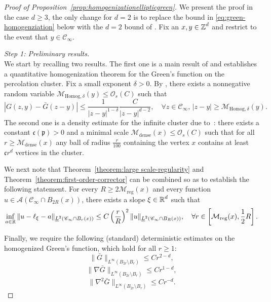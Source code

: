 \documentclass[12pt]{amsart}
\numberwithin{equation}{section}
\begin{document}
	\begin{proof}[Proof of Proposition~\ref{prop:homogenizationellipticgreen}]
		We present the proof in the case $d \geq 3$, the only change for $d = 2$ is to replace the bound in \eqref{eq:green-homogenziation} below
		with the $d=2$ bound of \cite{dario-gu-green}. Fix an $x, y \in \operatorname{\mathbb{Z}}^d$ and restrict to the event that $y \in \mathscr{C}_{\infty}$. 
		
		{\it Step 1: Preliminary results.} \\ 
		We start by recalling two results. The first one is a main result of \cite{dario-gu-green} and establishes a quantitative homogenization theorem for the Green's function on the percolation cluster. 
		Fix a small exponent $\delta > 0$. 
		By \cite[Theorem 2]{dario-gu-green}, there exists a nonnegative random variable $\mathcal{M}_{\mathrm{Homog}, \delta}(y) \leq \mathcal{O}_s(C)$ such that 
		\begin{equation} \label{eq:green-homogenziation}
			|G(z,y) - \bar{G}(z-y)|  \leq \frac{1}{|z-y|^{1-\delta}}  \frac{C}{|z-y|^{d-2}}, \quad \forall z \in \mathscr{C}_\infty, \, |z-y| \geq \mathcal{M}_{\mathrm{Homog}, \delta}(y).
		\end{equation}
		The second one is a density estimate for the infinite cluster due to~\cite[Theorem 1]{penrose-pisztora-1996}: 
		there exists a constant $\mathfrak{c}(\mathfrak{p}) > 0$ and a minimal scale $\mathcal{M}_{\mathrm{dense}}(x) \leq \mathcal{O}_s(C)$ 
		such that for all  $r \geq \mathcal{M}_{\mathrm{dense}}(x)$ any ball of radius $\frac{r}{100}$
		containing the vertex $x$ contains at least $\mathfrak{c} r^d$ vertices in the cluster. 
		
		We next note that Theorem~\ref{theorem:large scale-regularity} and Theorem~\ref{theorem:first-order-corrector} can be combined so as to establish the following statement. For every $R \geq 2 \mathcal{M}_{\mathrm{reg}}(x)$ and every function $u \in \mathcal{A}(\mathscr{C}_{\infty} \cap B_{2 R}(x))$, 
		there exists a slope $\xi \in \operatorname{\mathbb{R}}^d$ such that 
		\begin{equation} \label{eq:large scale-regularity}
			\inf_{a \in \operatorname{\mathbb{R}}} \| u - \ell_\xi  - a \|_{\underline{L}^2(\mathscr{C}_{\infty} \cap B_r(x))} \leq C \left( \frac{r}{R} \right)^2 \|u\|_{\underline{L}^2( \mathscr{C}_{\infty} \cap B_R(x))}, \quad \forall 
			r \in \left[\mathcal{M}_{\mathrm{reg}}(x), \frac{1}{2} R\right].
		\end{equation}
		
		Finally, we require the following (standard) deterministic estimates on the homogenized Green's function,
		which hold for all $r \geq 1$:
		\begin{equation} \label{eq:decay-estimate}
			\| \bar{G}\|_{L^\infty(B_{2r} \setminus B_r)} \leq C r^{2-d},
		\end{equation}
		\begin{equation} \label{eq:green-gradient-estimate}
			\| \nabla \bar{G}\|_{L^\infty(B_{2r} \setminus B_r)} \leq C r^{1-d},
		\end{equation}
		\begin{equation} \label{eq:green-hessian-estimate}
			\| \nabla^2 \bar{G}\|_{L^\infty(B_{2r} \setminus B_r)} \leq C r^{-d}.
		\end{equation}
		

\end{proof}
\end{document}
